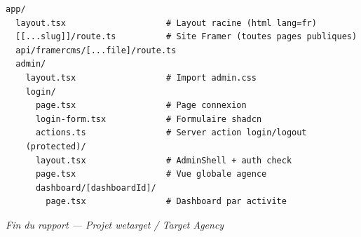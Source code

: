 \documentclass[11pt,a4paper]{report}
\begin{document}
\begin{verbatim}
app/
  layout.tsx                    # Layout racine (html lang=fr)
  [[...slug]]/route.ts          # Site Framer (toutes pages publiques)
  api/framercms/[...file]/route.ts
  admin/
    layout.tsx                  # Import admin.css
    login/
      page.tsx                  # Page connexion
      login-form.tsx            # Formulaire shadcn
      actions.ts                # Server action login/logout
    (protected)/
      layout.tsx                # AdminShell + auth check
      page.tsx                  # Vue globale agence
      dashboard/[dashboardId]/
        page.tsx                # Dashboard par activite
\end{verbatim}

\vfill
\begin{center}
\small\textit{Fin du rapport — Projet wetarget / Target Agency}
\end{center}
\end{document}
